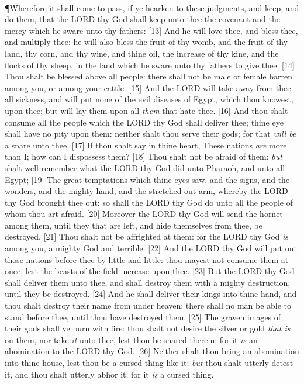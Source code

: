 \\
\P \textcolor[rgb]{0.00,0.00,1.00}{Wherefore it shall come to pass, if ye hearken to these judgments, and keep, and do them, that the LORD thy God shall keep unto thee the covenant and the mercy which he sware unto thy fathers:}
[13] \textcolor[rgb]{0.00,0.00,1.00}{And he will love thee, and bless thee, and multiply thee: he will also bless the fruit of thy womb, and the fruit of thy land, thy corn, and thy wine, and thine oil, the increase of thy kine, and the flocks of thy sheep, in the land which he sware unto thy fathers to give thee.}
[14] \textcolor[rgb]{0.00,0.00,1.00}{Thou shalt be blessed above all people: there shall not be male or female barren among you, or among your cattle.}
[15] \textcolor[rgb]{0.00,0.00,1.00}{And the LORD will take away from thee all sickness, and will put none of the evil diseases of Egypt, which thou knowest, upon thee; but will lay them upon all \emph{them} that hate thee.}
[16] \textcolor[rgb]{0.00,0.00,1.00}{And thou shalt consume all the people which the LORD thy God shall deliver thee; thine eye shall have no pity upon them: neither shalt thou serve their gods; for that \emph{will be} a snare unto thee.}
[17] \textcolor[rgb]{0.00,0.00,1.00}{If thou shalt say in thine heart, These nations \emph{are} more than I; how can I dispossess them?}
[18] \textcolor[rgb]{0.00,0.00,1.00}{Thou shalt not be afraid of them: \emph{but} shalt well remember what the LORD thy God did unto Pharaoh, and unto all Egypt;}
[19] \textcolor[rgb]{0.00,0.00,1.00}{The great temptations which thine eyes saw, and the signs, and the wonders, and the mighty hand, and the stretched out arm, whereby the LORD thy God brought thee out: so shall the LORD thy God do unto all the people of whom thou art afraid.}
[20] \textcolor[rgb]{0.00,0.00,1.00}{Moreover the LORD thy God will send the hornet among them, until they that are left, and hide themselves from thee, be destroyed.}
[21] \textcolor[rgb]{0.00,0.00,1.00}{Thou shalt not be affrighted at them: for the LORD thy God \emph{is} among you, a mighty God and terrible.}
[22] \textcolor[rgb]{0.00,0.00,1.00}{And the LORD thy God will put out those nations before thee by little and little: thou mayest not consume them at once, lest the beasts of the field increase upon thee.}
[23] \textcolor[rgb]{0.00,0.00,1.00}{But the LORD thy God shall deliver them unto thee, and shall destroy them with a mighty destruction, until they be destroyed.}
[24] \textcolor[rgb]{0.00,0.00,1.00}{And he shall deliver their kings into thine hand, and thou shalt destroy their name from under heaven: there shall no man be able to stand before thee, until thou have destroyed them.}
[25] \textcolor[rgb]{0.00,0.00,1.00}{The graven images of their gods shall ye burn with fire: thou shalt not desire the silver or gold \emph{that is} on them, nor take \emph{it} unto thee, lest thou be snared therein: for it \emph{is} an abomination to the LORD thy God.}
[26] \textcolor[rgb]{0.00,0.00,1.00}{Neither shalt thou bring an abomination into thine house, lest thou be a cursed thing like it: \emph{but} thou shalt utterly detest it, and thou shalt utterly abhor it; for it \emph{is} a cursed thing.}
\newpage
